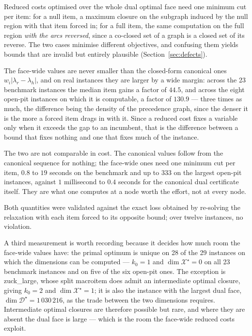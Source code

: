 \documentclass[11pt,a4paper]{article}
\begin{document}
Reduced costs optimised over the whole dual optimal face need one minimum cut
per item: for a null item, a maximum closure on the subgraph induced by the
null region with that item forced in; for a full item, the same computation on
the full region \emph{with the arcs reversed}, since a co-closed set of a
graph is a closed set of its reverse. The two cases minimise different
objectives, and confusing them yields bounds that are invalid but entirely
plausible (Section~\ref{sec:defects}).

The face-wide values are never smaller than the closed-form canonical ones
$w_i|\lambda_r-\lambda_h|$, and on real instances they are larger by a wide
margin: across the 23 benchmark instances the median item gains a factor of
$44.5$, and across the eight open-pit instances on which it is computable, a
factor of $130.9$ --- three times as much, the difference being the density of
the precedence graph, since the denser it is the more a forced item drags in
with it. Since a
reduced cost fixes a variable only when it exceeds the gap to an incumbent,
that is the difference between a bound that fixes nothing and one that fixes
much of the instance.

The two are not comparable in cost. The canonical values follow from the
canonical sequence for nothing; the face-wide ones need one minimum cut per
item, $0.8$ to $19$ seconds on the benchmark and up to $333$ on the largest
open-pit instances, against $1$ millisecond to $0.4$ seconds for the canonical
dual certificate itself. They are what one
computes at a node worth the effort, not at every node.

Both quantities were validated against the exact loss obtained by re-solving
the relaxation with each item forced to its opposite bound; over twelve
instances, no violation.

A third measurement is worth recording because it decides how much room the
face-wide values have: the primal optimum is unique on 28 of the 29 instances
on which the dimensions can be computed --- $k_0=1$ and
$\dim\mathcal X^\star=0$ on all 23 benchmark instances and on five of the six
open-pit ones. The exception is zuck\_large, whose split macroitem does admit
an intermediate optimal closure, giving $k_0=2$ and $\dim\mathcal X^\star=1$;
it is also the instance with the largest dual face,
$\dim\mathcal D^\star=1\,030\,216$, as the trade between the two dimensions
requires. Intermediate optimal closures are therefore possible but rare, and
where they are absent the dual face is large --- which is the room the
face-wide reduced costs exploit.
\end{document}
